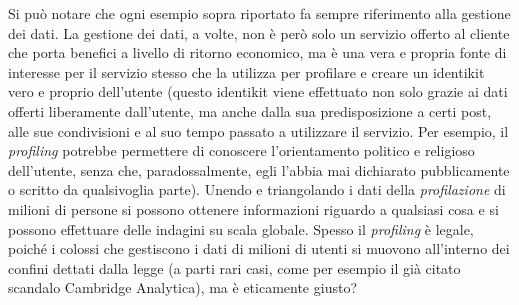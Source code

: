 Si può notare che ogni esempio sopra riportato fa sempre riferimento alla gestione dei dati. La gestione dei dati, a volte, non è però solo un servizio offerto al cliente che porta benefici a livello di ritorno economico, ma è una vera e propria fonte di interesse per il servizio stesso che la utilizza per profilare e creare un identikit vero e proprio dell’utente (questo identikit viene effettuato non solo grazie ai dati offerti liberamente dall’utente, ma anche dalla sua predisposizione a certi post, alle sue condivisioni e al suo tempo passato a utilizzare il servizio. Per esempio, il \textit{profiling} potrebbe permettere di conoscere l’orientamento politico e religioso dell’utente, senza che, paradossalmente, egli l’abbia mai dichiarato pubblicamente o scritto da qualsivoglia parte). Unendo e triangolando i dati della \textit{profilazione} di milioni di persone si possono ottenere informazioni riguardo a qualsiasi cosa e si possono effettuare delle indagini su scala globale. Spesso il \textit{profiling} è legale, poiché i colossi che gestiscono i dati di milioni di utenti si muovono all’interno dei confini dettati dalla legge (a parti rari casi, come per esempio il già citato scandalo Cambridge Analytica), ma è eticamente giusto?